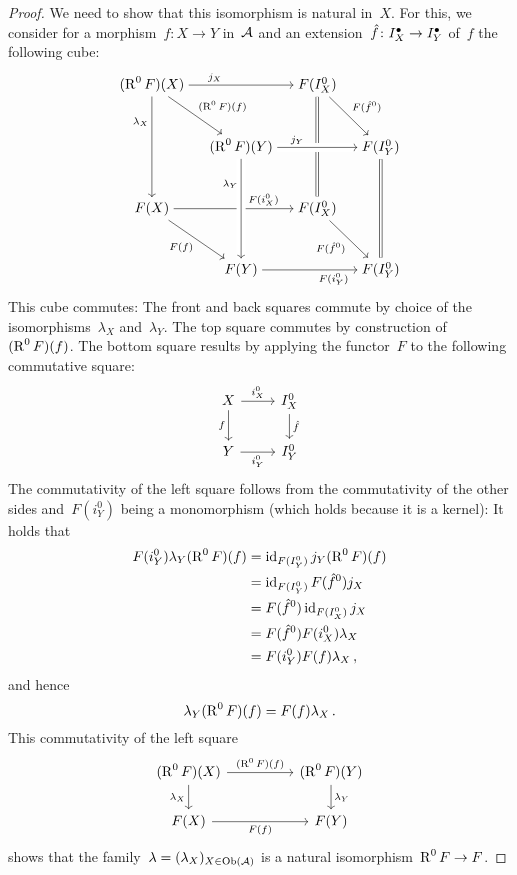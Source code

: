 \begin{proof}
  We need to show that this isomorphism is natural in~$X$.
  For this, we consider for a morphism~$f \colon X \to Y$ in~$\mathcal{A}$ and an extension~$\hat{f} \colon I^\bullet_X \to I^\bullet_Y$ of~$f$ the following cube:
  \[
    \begin{tikzcd}[row sep = large, column sep = small, cramped]
        (\Right^0 F)(X)
        \arrow{rr}[above, near start]{j_X}
        \arrow{dr}[above right]{(\Right^0 F)(f)}
        \arrow{dd}[left, near start]{\lambda_X}
      & {}
      & F(I^0_X)
        \arrow{dr}[above right]{F(\hat{f}^0)}
        \arrow[equal]{dd}
      & {}
      \\
        {}
      & (\Right^0 F)(Y)
      & {}
      & F(I^0_Y)
        \arrow[from=ll, crossing over, "j_Y", near start]
        \arrow[equal]{dd}
      \\
        F(X)
        \arrow{rr}[above, near end]{F(i^0_X)}
        \arrow{dr}[below left]{F(f)}
      & {}
      & F(I^0_X)
        \arrow{dr}[below left]{F(\hat{f}^0)}
      & {}
      \\
        {}
      & F(Y)
        \arrow[from=uu, crossing over, "\lambda_Y", swap, near start]
        \arrow{rr}[below, near end]{F(i^0_Y)}
      & {}
      & F(I^0_Y)
    \end{tikzcd}
  \]
  This cube commutes:
  The front and back squares commute by choice of the isomorphisms~$\lambda_X$ and~$\lambda_Y$.
  The top square commutes by construction of~$(\operatorname{R}^0 F)(f)$.
  The bottom square results by applying the functor~$F$ to the following commutative square:
  \[
    \begin{tikzcd}
        X
        \arrow{r}[above]{i^0_X}
        \arrow{d}[left]{f}
      & I^0_X
        \arrow{d}[right]{\hat{f}}
      \\
        Y
        \arrow{r}[below]{i^0_Y}
      & I^0_Y
    \end{tikzcd}
  \]
  The commutativity of the left square follows from the commutativity of the other sides and~$F(i^0_Y)$ being a monomorphism (which holds because it is a kernel):
  It holds that
  \begin{align*}
        F(i^0_Y) \lambda_Y (\operatorname{R}^0 F)(f)
    &=  \operatorname{id}_{F(I^0_Y)} j_Y (\operatorname{R}^0 F)(f)  \\
    &=  \operatorname{id}_{F(I^0_Y)} F(\hat{f}^0) j_X \\
    &=  F(\hat{f}^0) \operatorname{id}_{F(I^0_X)} j_X \\
    &=  F(\hat{f}^0) F(i^0_X) \lambda_X \\
    &=  F(i^0_Y) F(f) \lambda_X \,,
  \end{align*}
  and hence
  \[
      \lambda_Y (\operatorname{R}^0 F)(f)
    = F(f) \lambda_X  \,.
  \]
  This commutativity of the left square
  \[
    \begin{tikzcd}[column sep = huge]
        (\Right^0 F)(X)
        \arrow{r}[above]{(\Right^0 F)(f)}
        \arrow{d}[left]{\lambda_X}
      & (\Right^0 F)(Y)
        \arrow{d}[right]{\lambda_Y}
      \\
        F(X)
        \arrow{r}[below]{F(f)}
      & F(Y)
    \end{tikzcd}
  \]
  shows that the family~$\lambda = (\lambda_X)_{X \in \operatorname{Ob}(\mathcal{A})}$ is a natural isomorphism~$\operatorname{R}^0 F \to F$.
\end{proof}


